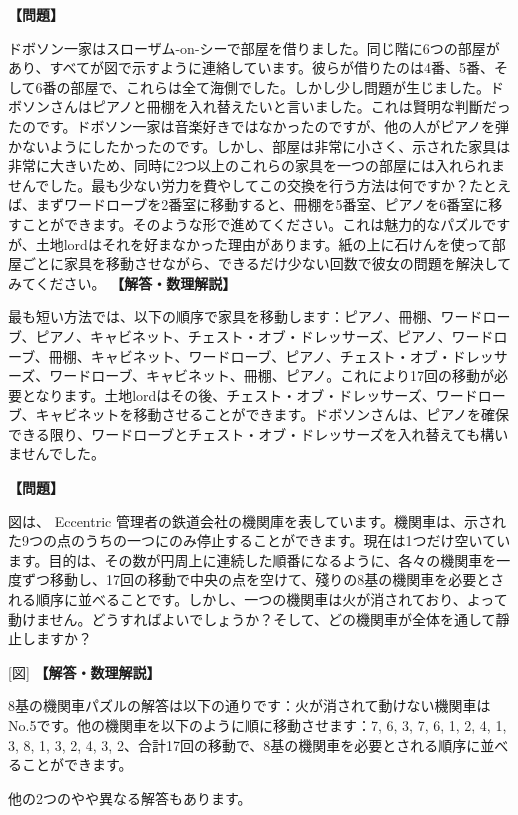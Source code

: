 \documentclass[10pt,a4paper,oneside,openany]{ltjsbook}
\begin{document}
\begin{tcolorbox}[colback=softblue,colframe=primaryblue,title=\textbf{第 220 問：宿屋での難題 （原題: A LODGING-HOUSE DIFFICULTY.）},arc=2mm,boxrule=1pt,breakable]
\textbf{【問題】}\par\vspace{0.3em}
ドボソン一家はスローザム-on-シーで部屋を借りました。同じ階に6つの部屋があり、すべてが図で示すように連絡しています。彼らが借りたのは4番、5番、そして6番の部屋で、これらは全て海側でした。しかし少し問題が生じました。ドボソンさんはピアノと冊棚を入れ替えたいと言いました。これは賢明な判斷だったのです。ドボソン一家は音楽好きではなかったのですが、他の人がピアノを弾かないようにしたかったのです。しかし、部屋は非常に小さく、示された家具は非常に大きいため、同時に2つ以上のこれらの家具を一つの部屋には入れられませんでした。最も少ない労力を費やしてこの交換を行う方法は何ですか？たとえば、まずワードローブを2番室に移動すると、冊棚を5番室、ピアノを6番室に移すことができます。そのような形で進めてください。これは魅力的なパズルですが、土地lordはそれを好まなかった理由があります。紙の上に石けんを使って部屋ごとに家具を移動させながら、できるだけ少ない回数で彼女の問題を解決してみてください。
\tcblower
\textbf{【解答・数理解説】}\par\vspace{0.3em}
最も短い方法では、以下の順序で家具を移動します：ピアノ、冊棚、ワードローブ、ピアノ、キャビネット、チェスト・オブ・ドレッサーズ、ピアノ、ワードローブ、冊棚、キャビネット、ワードローブ、ピアノ、チェスト・オブ・ドレッサーズ、ワードローブ、キャビネット、冊棚、ピアノ。これにより17回の移動が必要となります。土地lordはその後、チェスト・オブ・ドレッサーズ、ワードローブ、キャビネットを移動させることができます。ドボソンさんは、ピアノを確保できる限り、ワードローブとチェスト・オブ・ドレッサーズを入れ替えても構いませんでした。
\end{tcolorbox}

\begin{tcolorbox}[colback=softblue,colframe=primaryblue,title=\textbf{第 221 問：8基の機関車 （原題: THE EIGHT ENGINES.）},arc=2mm,boxrule=1pt,breakable]
\textbf{【問題】}\par\vspace{0.3em}
図は、 Eccentric 管理者の鉄道会社の機関庫を表しています。機関車は、示された9つの点のうちの一つにのみ停止することができます。現在は1つだけ空いています。目的は、その数が円周上に連続した順番になるように、各々の機関車を一度ずつ移動し、17回の移動で中央の点を空けて、殘りの8基の機関車を必要とされる順序に並べることです。しかし、一つの機関車は火が消されており、よって動けません。どうすればよいでしょうか？そして、どの機関車が全体を通して靜止しますか？

[図]
\tcblower
\textbf{【解答・数理解説】}\par\vspace{0.3em}
8基の機関車パズルの解答は以下の通りです：火が消されて動けない機関車はNo.5です。他の機関車を以下のように順に移動させます：7, 6, 3, 7, 6, 1, 2, 4, 1, 3, 8, 1, 3, 2, 4, 3, 2、合計17回の移動で、8基の機関車を必要とされる順序に並べることができます。

他の2つのやや異なる解答もあります。
\end{tcolorbox}
\end{document}
